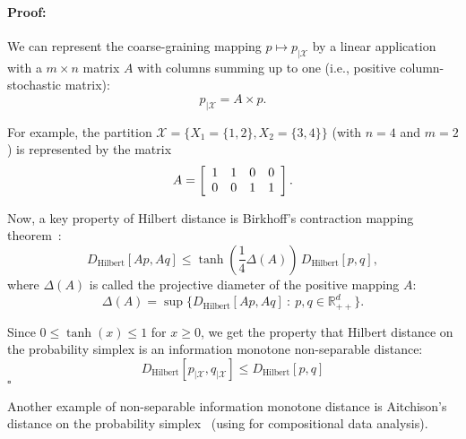 \documentclass{article}
\newenvironment{proof}{\paragraph{Proof:}}{\hfill$\square$}
\def\bbR{\mathbb{R}}
\def\bbR{\mathbb{R}}
\def\calX{\mathcal{X}}
\def\Hilbert{\mathrm{Hilbert}}
\begin{document}
\begin{proof}
We can represent the coarse-graining mapping $p\mapsto p_{|\calX}$ by a linear application with a $m\times n$ matrix $A$ with columns  summing  up to one (i.e., positive column-stochastic matrix):
$$
p_{|\calX} = A \times p.
$$

For example, the partition $\calX=\{X_1=\{1,2\},X_2=\{3,4\}\}$ (with $n=4$ and $m=2$) is represented by the matrix
$$
A=\left[\begin{array}{llll}1&1&0&0\cr 0&0&1&1\end{array}\right].
$$

Now, a key property of Hilbert distance is Birkhoff's contraction mapping theorem~\cite{birkhoff1957extensions,bushell1973projective}:
$$
D_\Hilbert[Ap,Aq]\leq \tanh\left(\frac{1}{4}\Delta(A)\right)\, D_\Hilbert[p,q],
$$
where $\Delta(A)$ is called the projective diameter of the positive mapping $A$:
$$
\Delta(A)=\sup\{D_\Hilbert[Ap,Aq]\ :\ p,q\in\bbR_{++}^d\}.
$$


Since $0\leq \tanh(x)\leq 1$ for $x\geq 0$, we get the property that  Hilbert distance on the probability simplex is an information monotone non-separable distance:
$$
D_\Hilbert[p_{|\calX},q_{|\calX}]\leq D_\Hilbert[p,q]
$$
\end{proof}

Another example of non-separable information monotone distance is Aitchison's distance on the probability simplex~\cite{erb2021information} (using for compositional data analysis).



\end{document}
